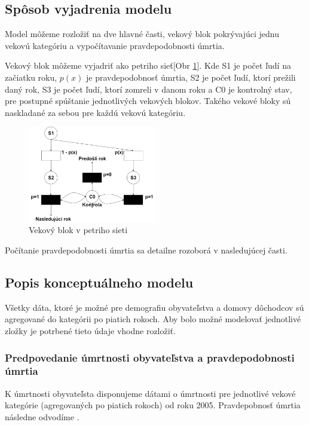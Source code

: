\documentclass[a4paper, 11pt]{article}
\begin{document}
\subsection{Spôsob vyjadrenia modelu}
Model môžeme rozložiť na dve hlavné časti, vekový blok pokrývajúci jednu vekovú kategóriu a vypočítavanie pravdepodobnosti úmrtia.

Vekový blok môžeme vyjadriť ako petriho sieť\cite[str. 123]{IMS}[Obr \ref{petri}]. Kde S1 je počet ľudí na začiatku roku, $p(x)$ je pravdepodobnosť úmrtia, S2 je počet ľudí, ktorí prežili daný rok, S3 je počet ľudí, ktorí zomreli v danom roku a C0 je kontrolný stav, pre postupné spúštanie jednotlivých vekových blokov. Takého vekové bloky sú naskladané za sebou pre každú vekovú kategóriu.
\renewcommand{\figurename}{Obr}
\begin{figure}[H]
\centering
\includegraphics[width=0.5\textwidth]{petri}
\caption{Vekový blok v petriho sieti\label{petri}}
\end{figure}
Počítanie pravdepodobnosti úmrtia sa detailne rozoborá v nasledujúcej časti.


\subsection{Popis konceptuálneho modelu}
Všetky dáta, ktoré je možné pre demografiu obyvateľstva a domovy dôchodcov sú agregované do kategórii po piatich rokoch. Aby bolo možné modelovať jednotlivé zložky je potrbené tieto údaje vhodne rozložiť.

\subsubsection*{Predpovedanie úmrtnosti obyvateľstva a pravdepodobnosti úmrtia}
K úmrtnosti obyvateľsta disponujeme dátami o úmrtnosti pre jednotlivé vekové kategórie (agregovaných po piatich rokoch) od roku 2005. Pravdepobnosť úmrtia následne odvodíme \cite{prob}.
\end{document}
